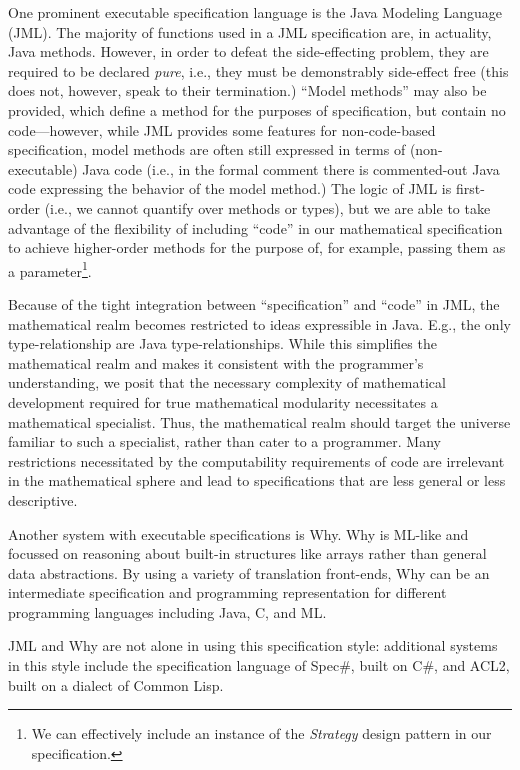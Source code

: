 One prominent executable specification language is the Java Modeling Language (JML)\cite{leavensJML}.  The majority of functions used in a JML specification are, in actuality, Java methods.  However, in order to defeat the side-effecting problem, they are required to be declared \emph{pure}, i.e., they must be demonstrably side-effect free (this does not, however, speak to their termination.)  ``Model methods'' may also be provided, which define a method for the purposes of specification, but contain no code---however, while JML provides some features for non-code-based specification, model methods are often still expressed in terms of (non-executable) Java code (i.e., in the formal comment there is commented-out Java code expressing the behavior of the model method.)  The logic of JML is first-order (i.e., we cannot quantify over methods or types), but we are able to take advantage of the flexibility of including ``code'' in our mathematical specification to achieve higher-order methods for the purpose of, for example, passing them as a parameter\footnote{We can effectively include an instance of the \emph{Strategy} design pattern in our specification.}.

Because of the tight integration between ``specification'' and ``code'' in JML, the mathematical realm becomes restricted to ideas expressible in Java.  E.g., the only type-relationship are Java type-relationships.  While this simplifies the mathematical realm and makes it consistent with the programmer's understanding, we posit that the necessary complexity of mathematical development required for true mathematical modularity necessitates a mathematical specialist.  Thus, the mathematical realm should target the universe familiar to such a specialist, rather than cater to a programmer.  Many restrictions necessitated by the computability requirements of code are irrelevant in the mathematical sphere and lead to specifications that are less general or less descriptive.

Another system with executable specifications is Why\cite{bobotWhy}.  Why is ML-like and focussed on reasoning about built-in structures like arrays rather than general data abstractions.  By using a variety of translation front-ends, Why can be an intermediate specification and programming representation for different programming languages including Java, C, and ML\cite{something}.

JML and Why are not alone in using this specification style: additional systems in this style include the specification language of Spec\#\cite{specsharp}, built on C\#, and ACL2\cite{kaufmannACL2}, built on a dialect of Common Lisp.

